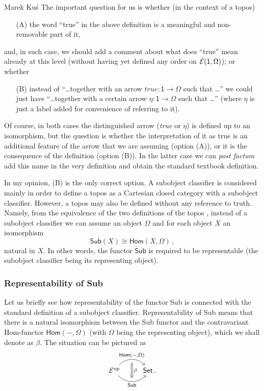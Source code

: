 \begin{artengenv}{Marek Ku\'s}
\noindent The important question for us is whether (in the context of a topos)
\begin{enumerate}
	\item[(A)] the word ``true'' in the above definition is a meaningful and non-removable part of it,
\end{enumerate}
and, in such case, we should add a comment about what does ``true'' mean already at this level (without having yet defined any order on $ \mathcal{E}(\textsf{1},\Omega) $); or whether
\begin{enumerate}
	\item[(B)]\label{opcje} instead of ``\ldots together with an arrow $ \textit{true}: \textsf{1} \to \Omega $ such that \ldots'' we could just have ``\ldots together with a certain arrow $\eta: \textsf{1} \to \Omega $ such that \ldots'' (where $ \eta $ is just a label added for convenience of referring to it).
\end{enumerate}  
Of course, in both cases the distinguished arrow (\textit{true} or $ \eta $) is defined up to an isomorphism, but the question is whether the interpretation of it as true is an additional feature of the arrow that we are assuming (option (A)), or it is the consequence of the definition (option (B)). In the latter case we can \textit{post factum} add this name in the very definition and obtain the standard textbook definition.


In my opinion, (B) is the only correct option. A subobject classifier is considered mainly in order to define a topos as a Cartesian closed category with a subobject classifier. However, a topos may also be defined without any reference to truth. Namely, from the equivalence of the two definitions of the topos \parencite[p.161f and 163]{maclane-moerdijk-1994}, instead of a subobject classifier we can assume an object $ \Omega $ and for each object $ X $ an isomorphism 
\[
\textsf{Sub}(X) \cong \textsf{Hom}(X, \Omega) \, ,
\]
natural in $ X $. In other words, the functor $ \textsf{Sub} $ is required to be representable (the subobject classifier being its representing object).

\subsubsection{Representability of \textsf{Sub}}

Let us briefly see how representability of the functor \textsf{Sub} is connected with the standard definition of a subobject classifier. Representability of \textsf{Sub} means that there is a natural isomorphism between the \textsf{Sub} functor and the contravariant \textsf{Hom}-functor $ \textsf{Hom}(-,\Omega) $ (with $ \Omega $ being the representing object), which we shall denote as $ \beta $. The situation can be pictured as
\begin{equation}\label{natur}
\begin{tikzcd}
\mc{E}^{op} \arrow[r, bend left=50, ""{name=U, below}, "{\textsf{Hom}\left(-,\Omega\right)}"]
\arrow[r, bend right=50, ""{name=D}, "\textsf{Sub}"']
& \textsf{Set}
\arrow[Rightarrow, from=U, to=D,"\beta"]  \, .
\end{tikzcd}
\end{equation}


\end{artengenv}
